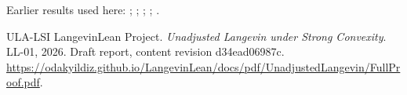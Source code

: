 \documentclass[11pt,a4paper]{article}
\begin{document}
Earlier results used here: \cite[Section~3.11.1]{LangevinLean2026ULASC}; \cite[Section~3.11.3]{LangevinLean2026ULASC}; \cite[Section~3.13.2]{LangevinLean2026ULASC}; \cite[Section~3.13.5]{LangevinLean2026ULASC}; \cite[Section~3.13.6]{LangevinLean2026ULASC}.

\begin{thebibliography}{ULA-LSI}
LangevinLean Project. \emph{Unadjusted Langevin under Strong Convexity}. LL-01, 2026. Draft report, content revision d34ead06987c. \url{https://odakyildiz.github.io/LangevinLean/docs/pdf/UnadjustedLangevin/FullProof.pdf}.
\end{thebibliography}
\end{document}
